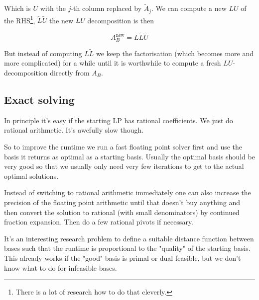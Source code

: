 Which is $U$ with the $j$-th column replaced by $\tilde A_j$. We can compute a new $LU$ of the RHS\footnote{There is a lot of research how to do that cleverly.}, $\tilde L \tilde U$ the new $LU$ decomposition is then

\[A_B^{\text{new}} = L\tilde L \tilde U\]

But instead of computing $L\tilde L$ we keep the factorisation (which becomes more and more complicated) for a while until it is worthwhile to compute a fresh $LU$-decomposition directly from $A_B$.

\subsection{Exact solving}

In principle it's easy if the starting LP has rational coefficients. We just do rational arithmetic. It's awefully slow though. 

So to improve the runtime we run a fast floating point solver first and use the basis it returns as optimal as a starting basis. Usually the optimal basis should be very good so that we usually only need very few iterations to get to the actual optimal solutions.

Instead of switching to rational arithmetic immediately one can also increase the precision of the floating point arithmetic until that doesn't buy anything and then convert the solution to rational (with small denominators) by continued fraction expansion. Then do a few rational pivots if necessary.

It's an interesting research problem to define a suitable distance function between bases such that the runtime is proportional to the "quality" of the starting basis. This already works if the "good" basis is primal or dual feasible, but we don't know what to do for infeasible bases.